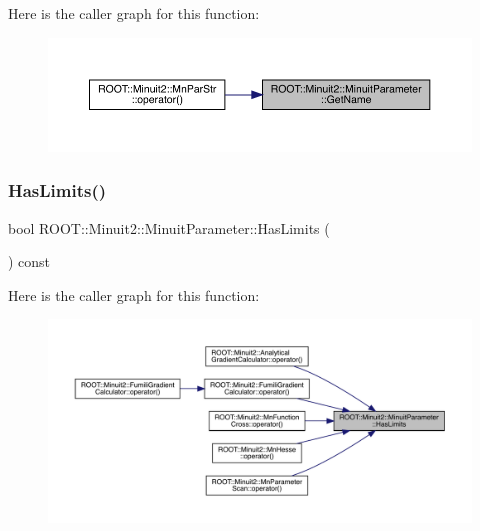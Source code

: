 Here is the caller graph for this function\+:
\nopagebreak
\begin{figure}[H]
\begin{center}
\leavevmode
\includegraphics[width=350pt]{dd/dfb/classROOT_1_1Minuit2_1_1MinuitParameter_adc67abcb32783aed362068ee38cb24b7_icgraph}
\end{center}
\end{figure}
\mbox{\label{classROOT_1_1Minuit2_1_1MinuitParameter_a6319fe000027da162c4adad8782ef27b}} 
\subsubsection{\texorpdfstring{HasLimits()}{HasLimits()}\hspace{0.1cm}{\footnotesize\ttfamily [1/3]}}
{\footnotesize\ttfamily bool R\+O\+O\+T\+::\+Minuit2\+::\+Minuit\+Parameter\+::\+Has\+Limits (\begin{DoxyParamCaption}{ }\end{DoxyParamCaption}) const\hspace{0.3cm}{\ttfamily [inline]}}

Here is the caller graph for this function\+:
\nopagebreak
\begin{figure}[H]
\begin{center}
\leavevmode
\includegraphics[width=350pt]{dd/dfb/classROOT_1_1Minuit2_1_1MinuitParameter_a6319fe000027da162c4adad8782ef27b_icgraph}
\end{center}
\end{figure}
\mbox{\label{classROOT_1_1Minuit2_1_1MinuitParameter_a6319fe000027da162c4adad8782ef27b}} 
